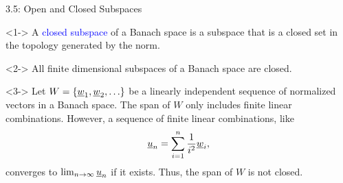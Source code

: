 \documentclass[10pt,letterpaper,english]{beamer}
\begin{document}
\begin{frame}{3.5: Open and Closed Subspaces}

\begin{definition}<1->
A \textcolor{blue}{closed subspace} of a Banach space is a subspace that is a closed set in the topology generated by the norm.
\end{definition}

\begin{theorem}<2->
All finite dimensional subspaces of a Banach space are closed.
\end{theorem}

\begin{example}<3->
Let $W = \{\underline{w}_1 ,\underline{w}_2 , \ldots \}$ be a linearly independent sequence of normalized vectors in a Banach space.
The span of $W$ only includes finite linear combinations.
However, a sequence of finite linear combinations, like \vspace{-2mm}
\[ \vecnot{u}_n = \sum_{i=1}^n \frac{1}{i^2} \vecnot{w}_i , \vspace{-1mm}\]  converges to $\lim_{n\to \infty} \underline{u}_n$ if it exists.
Thus, the span of $W$ is not closed.
\end{example}

\end{frame}
\end{document}
